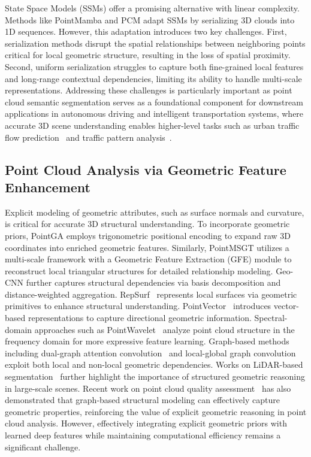 \documentclass[a4paper,fleqn]{cas-sc}
\begin{document}
State Space Models (SSMs) \cite{Mamba} offer a promising alternative with linear complexity. Methods like PointMamba \cite{PointMamba} and PCM \cite{pcm} adapt SSMs by serializing 3D clouds into 1D sequences. However, this adaptation introduces two key challenges. First, serialization methods disrupt the spatial relationships between neighboring points critical for local geometric structure, resulting in the loss of spatial proximity. Second, uniform serialization struggles to capture both fine-grained local features and long-range contextual dependencies, limiting its ability to handle multi-scale representations. Addressing these challenges is particularly important as point cloud semantic segmentation serves as a foundational component for downstream applications in autonomous driving and intelligent transportation systems, where accurate 3D scene understanding enables higher-level tasks such as urban traffic flow prediction~\cite{ALI1,ALI2} and traffic pattern analysis~\cite{ALI3}.


\subsection{Point Cloud Analysis via Geometric Feature Enhancement}

Explicit modeling of geometric attributes, such as surface normals and
curvature, is critical for accurate 3D structural understanding. To
incorporate geometric priors, PointGA \cite{pointga} employs
trigonometric positional encoding to expand raw 3D coordinates
into enriched geometric features. Similarly, PointMSGT \cite{pointmsgt}
utilizes a multi-scale framework with a Geometric Feature Extraction
(GFE) module to reconstruct local triangular structures for detailed
relationship modeling. Geo-CNN \cite{geo-cnn} further captures
structural dependencies via basis decomposition and distance-weighted
aggregation. RepSurf~\cite{repsurf} represents local surfaces via geometric primitives to enhance structural understanding. PointVector~\cite{pointvector} introduces vector-based representations to capture directional geometric information. Spectral-domain approaches such as PointWavelet~\cite{pointwavelet} analyze point cloud structure in the frequency domain for more expressive feature learning. Graph-based methods including dual-graph attention convolution~\cite{dgacn} and local-global graph convolution~\cite{lggcm} exploit both local and non-local geometric dependencies. Works on LiDAR-based segmentation~\cite{lidar_segmentation} further highlight the importance of structured geometric reasoning in large-scale scenes. Recent work on point cloud quality assessment~\cite{noReference} has also demonstrated that graph-based structural modeling can effectively capture geometric properties, reinforcing the value of explicit geometric reasoning in point cloud analysis. However, effectively integrating explicit geometric priors with learned deep features while maintaining computational efficiency remains a significant challenge.
\end{document}
